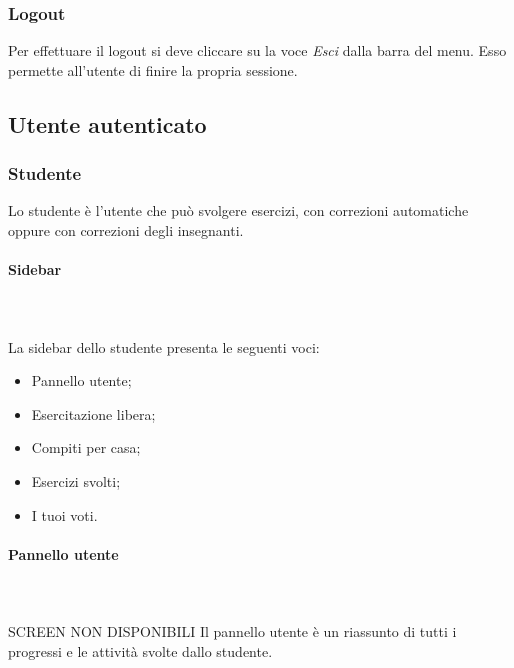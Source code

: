     \subsubsection{Logout}
    Per effettuare il {logout} si deve cliccare su la voce \textit{Esci} dalla barra del menu. Esso permette all'utente  di finire la propria sessione.
    \newpage

\subsection{Utente autenticato}

    \subsubsection{Studente}
    Lo studente è l'utente che può svolgere esercizi, con correzioni
    automatiche oppure con correzioni degli insegnanti.
        \paragraph{Sidebar} \mbox{}\\ \\
            La sidebar dello studente presenta le seguenti voci:
            \begin{itemize}
                \item Pannello utente;
                \item Esercitazione libera;
                \item Compiti per casa;
                \item Esercizi svolti;
                \item I tuoi voti.
            \end{itemize}
        \paragraph{Pannello utente}\mbox{}\\ \\
        SCREEN NON DISPONIBILI
        Il pannello utente è un riassunto di tutti i progressi e le attività
        svolte dallo studente.
